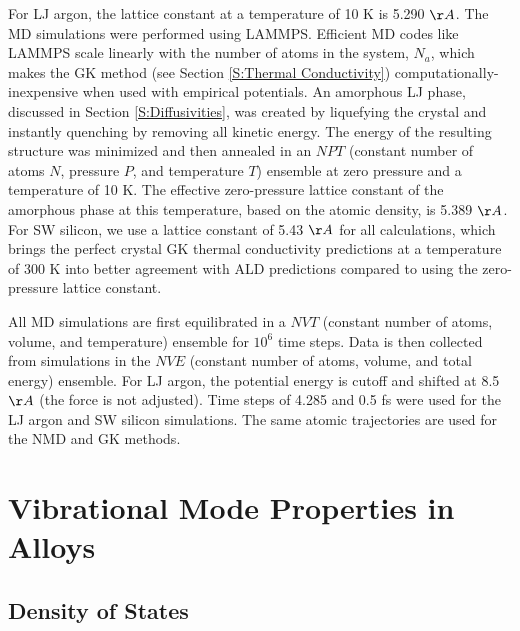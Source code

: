 \documentclass[aps,prb,onecolumn,preprint,footinbib,superscriptaddress,amsmath,amssymb,floatfix]{revtex4}
\begin{document}
For LJ argon, the lattice constant 
at a temperature of 10 K is 5.290 $\AA$.\cite{mcgaughey_phonon_2004} 
The MD simulations were performed using LAMMPS.\cite{plimpton_fast_1995} 
Efficient MD 
codes like LAMMPS scale linearly with the number of atoms in 
the system, $N_a$, which makes the GK method (see Section 
\ref{S:Thermal Conductivity}) 
computationally-inexpensive when used with empirical potentials. 
An amorphous LJ phase, discussed in Section \ref{S:Diffusivities}, 
was created by liquefying the crystal 
and instantly quenching by removing all kinetic energy.  The energy 
of the resulting structure was minimized and then annealed in an 
$NPT$ (constant number of atoms $N$, pressure $P$, and temperature $T$) 
ensemble at zero pressure and a temperature of 10 K.  
The effective zero-pressure lattice constant  
of the amorphous phase at this temperature, based on the atomic 
density, is 5.389 $\AA$.  
For SW silicon, we use a lattice constant of 5.43 $\AA$ 
for all calculations, which brings the perfect crystal GK 
thermal conductivity predictions at a temperature of 300 K
\cite{goicochea_thermal_2010,he_lattice_2012} 
into better agreement with ALD predictions\cite{sellan_cross-plane_2010} 
compared to using the zero-pressure lattice constant. 

All MD simulations are first equilibrated in a $NVT$ (constant 
number of atoms, volume, and temperature) ensemble for 
$10^6$ time steps. Data is then collected from simulations in the $NVE$ 
(constant number of 
atoms, volume, and total energy) ensemble. For LJ argon, the potential 
energy is cutoff and shifted at 8.5 $\AA$ (the force is not adjusted). 
Time steps of 4.285 and 0.5 fs were used for the LJ argon and 
SW silicon simulations. The same atomic trajectories are used for the 
NMD and GK methods. 

\section{\label{S:Vibrational}
Vibrational Mode Properties in Alloys}

\subsection{\label{S:VC Gamma DOS}Density of States}
\end{document}
